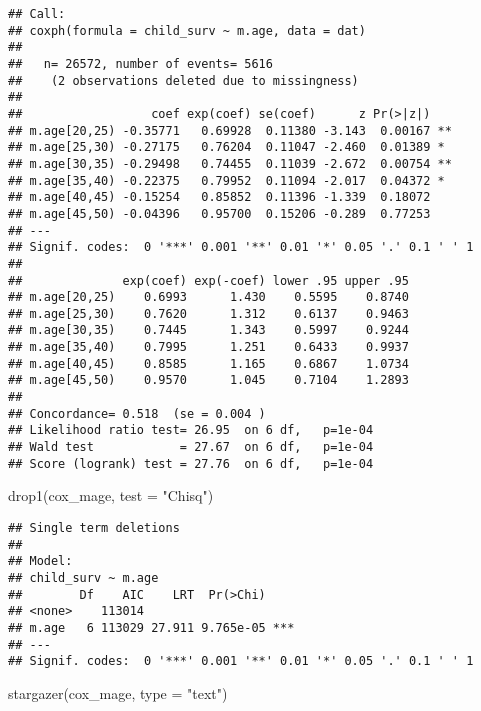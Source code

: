 \documentclass[
]{article}
\newenvironment{Shaded}{\begin{snugshade}}{\end{snugshade}}
\newcommand{\AttributeTok}[1]{\textcolor[rgb]{0.77,0.63,0.00}{#1}}
\newcommand{\FunctionTok}[1]{\textcolor[rgb]{0.00,0.00,0.00}{#1}}
\newcommand{\NormalTok}[1]{#1}
\newcommand{\StringTok}[1]{\textcolor[rgb]{0.31,0.60,0.02}{#1}}
\begin{document}
\begin{verbatim}
## Call:
## coxph(formula = child_surv ~ m.age, data = dat)
## 
##   n= 26572, number of events= 5616 
##    (2 observations deleted due to missingness)
## 
##                  coef exp(coef) se(coef)      z Pr(>|z|)   
## m.age[20,25) -0.35771   0.69928  0.11380 -3.143  0.00167 **
## m.age[25,30) -0.27175   0.76204  0.11047 -2.460  0.01389 * 
## m.age[30,35) -0.29498   0.74455  0.11039 -2.672  0.00754 **
## m.age[35,40) -0.22375   0.79952  0.11094 -2.017  0.04372 * 
## m.age[40,45) -0.15254   0.85852  0.11396 -1.339  0.18072   
## m.age[45,50) -0.04396   0.95700  0.15206 -0.289  0.77253   
## ---
## Signif. codes:  0 '***' 0.001 '**' 0.01 '*' 0.05 '.' 0.1 ' ' 1
## 
##              exp(coef) exp(-coef) lower .95 upper .95
## m.age[20,25)    0.6993      1.430    0.5595    0.8740
## m.age[25,30)    0.7620      1.312    0.6137    0.9463
## m.age[30,35)    0.7445      1.343    0.5997    0.9244
## m.age[35,40)    0.7995      1.251    0.6433    0.9937
## m.age[40,45)    0.8585      1.165    0.6867    1.0734
## m.age[45,50)    0.9570      1.045    0.7104    1.2893
## 
## Concordance= 0.518  (se = 0.004 )
## Likelihood ratio test= 26.95  on 6 df,   p=1e-04
## Wald test            = 27.67  on 6 df,   p=1e-04
## Score (logrank) test = 27.76  on 6 df,   p=1e-04
\end{verbatim}

\begin{Shaded}
\begin{Highlighting}[]
\FunctionTok{drop1}\NormalTok{(cox\_mage, }\AttributeTok{test =} \StringTok{"Chisq"}\NormalTok{)}
\end{Highlighting}
\end{Shaded}

\begin{verbatim}
## Single term deletions
## 
## Model:
## child_surv ~ m.age
##        Df    AIC    LRT  Pr(>Chi)    
## <none>    113014                     
## m.age   6 113029 27.911 9.765e-05 ***
## ---
## Signif. codes:  0 '***' 0.001 '**' 0.01 '*' 0.05 '.' 0.1 ' ' 1
\end{verbatim}

\begin{Shaded}
\begin{Highlighting}[]
\FunctionTok{stargazer}\NormalTok{(cox\_mage, }\AttributeTok{type =} \StringTok{"text"}\NormalTok{)}
\end{Highlighting}
\end{Shaded}
\end{document}
